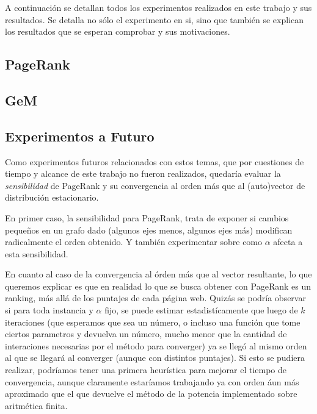\par A continuaci\'on se detallan todos los experimentos realizados en este
trabajo y sus resultados. Se detalla no s\'olo el experimento en si, sino que
tambi\'en se explican los resultados que se esperan comprobar y sus
motivaciones.

\subsection{PageRank}


\newpage


\newpage


\newpage


\newpage
\subsection{GeM}


\newpage


\newpage


\newpage


\newpage
\subsection*{Experimentos a Futuro}
\par Como experimentos futuros relacionados con estos temas, que por cuestiones
de tiempo y alcance de este trabajo no fueron realizados, quedaría evaluar la
\emph{sensibilidad} de PageRank y su convergencia al orden m\'as que al
(auto)vector de distribuci\'on estacionario.

\par En primer caso, la sensibilidad para PageRank, trata de exponer si cambios
peque\~nos en un grafo dado (algunos ejes menos, algunos ejes m\'as) modifican
radicalmente el orden obtenido. Y tambi\'en experimentar sobre como $\alpha$
afecta a esta sensibilidad.

\par En cuanto al caso de la convergencia al \'orden m\'as que al vector
resultante, lo que queremos explicar es que en realidad lo que se busca obtener
con PageRank es un ranking, m\'as all\'a de los puntajes de cada p\'agina web.
Quizás se podr\'ia observar si para toda instancia y $\alpha$ fijo, se puede
estimar estadist\'icamente que luego de $k$ iteraciones (que esperamos que sea
un n\'umero, o incluso una funci\'on que tome ciertos parametros y devuelva un
n\'umero, mucho menor que la cantidad de interaciones necesarias por el
m\'etodo para converger) ya se lleg\'o al mismo orden al que se llegar\'a al
converger (aunque con distintos puntajes). Si esto se pudiera realizar,
podr\'iamos tener una primera heur\'istica para mejorar el tiempo de
convergencia, aunque claramente estar\'iamos trabajando ya con orden \'aun m\'as
aproximado que el que devuelve el m\'etodo de la potencia implementado sobre
aritm\'etica finita.
